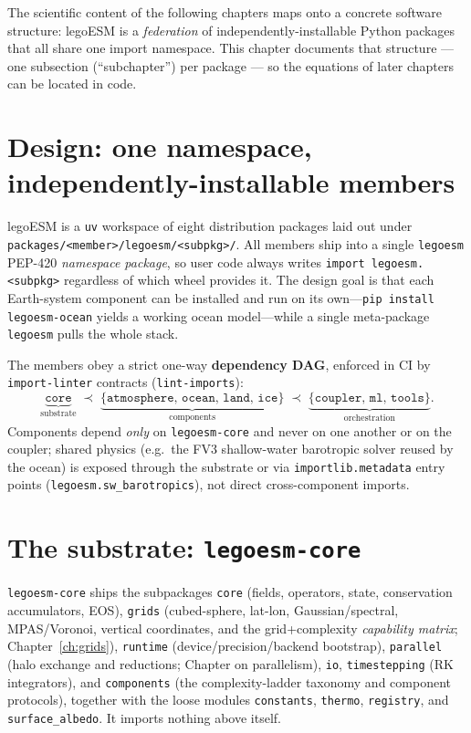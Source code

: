 \documentclass[11pt,twoside]{report}
\begin{document}
The scientific content of the following chapters maps onto a concrete software
structure: legoESM is a \emph{federation} of independently-installable Python
packages that all share one import namespace.  This chapter documents that
structure --- one subsection (``subchapter'') per package --- so the equations
of later chapters can be located in code.

\section{Design: one namespace, independently-installable members}
\label{sec:arch-federation}

legoESM is a \texttt{uv} workspace of eight distribution packages laid out under
\texttt{packages/<member>/legoesm/<subpkg>/}.  All members ship into a single
\texttt{legoesm} PEP-420 \emph{namespace package}, so user code always writes
\texttt{import legoesm.<subpkg>} regardless of which wheel provides it.  The
design goal is that each Earth-system component can be installed and run on its
own---\texttt{pip install legoesm-ocean} yields a working ocean model---while a
single meta-package \texttt{legoesm} pulls the whole stack.

The members obey a strict one-way \textbf{dependency DAG}, enforced in CI by
\texttt{import-linter} contracts (\texttt{lint-imports}):
\[
  \underbrace{\texttt{core}}_{\text{substrate}}
  \;\prec\;
  \underbrace{\{\texttt{atmosphere},\,\texttt{ocean},\,\texttt{land},\,\texttt{ice}\}}_{\text{components}}
  \;\prec\;
  \underbrace{\{\texttt{coupler},\,\texttt{ml},\,\texttt{tools}\}}_{\text{orchestration}}.
\]
Components depend \emph{only} on \texttt{legoesm-core} and never on one another
or on the coupler; shared physics (e.g.\ the FV3 shallow-water barotropic
solver reused by the ocean) is exposed through the substrate or via
\texttt{importlib.metadata} entry points (\texttt{legoesm.sw\_barotropics}), not
direct cross-component imports.

\section{The substrate: \texttt{legoesm-core}}
\label{sec:arch-core}

\texttt{legoesm-core} ships the subpackages \texttt{core} (fields, operators,
state, conservation accumulators, EOS), \texttt{grids} (cubed-sphere, lat-lon,
Gaussian/spectral, MPAS/Voronoi, vertical coordinates, and the grid+complexity
\emph{capability matrix}; Chapter~\ref{ch:grids}), \texttt{runtime}
(device/precision/backend bootstrap), \texttt{parallel} (halo exchange and
reductions; Chapter on parallelism), \texttt{io}, \texttt{timestepping}
(RK integrators), and \texttt{components} (the complexity-ladder taxonomy and
component protocols), together with the loose modules \texttt{constants},
\texttt{thermo}, \texttt{registry}, and \texttt{surface\_albedo}.  It imports
nothing above itself.
\end{document}
